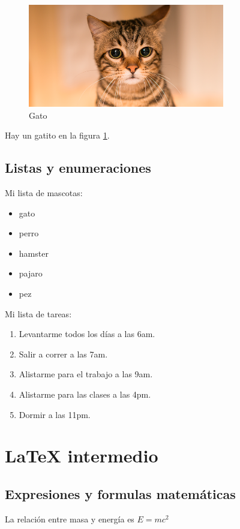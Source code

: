 \documentclass[12pt, letterpaper]{article}
\begin{document}
\begin{figure}[h]
    \centering
    \includegraphics[height=4.5cm]{gato.png}
    \caption{Gato}
    \label{fig:gato}
\end{figure}

Hay un gatito en la figura \ref{fig:gato}.\\

\subsection{Listas y enumeraciones}
Mi lista de mascotas:
\begin{itemize}
    \item gato
    \item perro
    \item hamster
    \item pajaro
    \item pez\\
\end{itemize}

Mi lista de tareas:
\begin{enumerate}
    \item Levantarme todos los días a las 6am.
    \item Salir a correr a las 7am.
    \item Alistarme para el trabajo a las 9am.
    \item Alistarme para las clases a las 4pm.
    \item Dormir a las 11pm.\\
\end{enumerate}

\section{LaTeX intermedio}
\subsection{Expresiones y formulas matemáticas}
La relación entre masa y energía es $E = mc^2$\\
\end{document}
